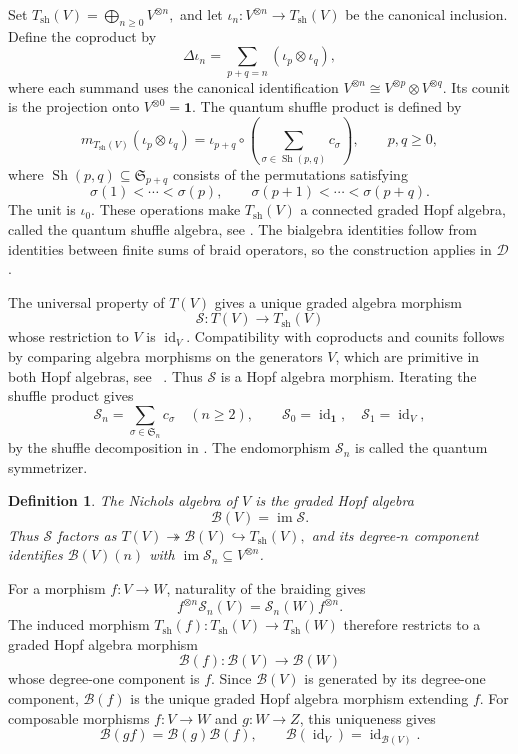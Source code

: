 \documentclass[11pt, a4paper]{article}
\numberwithin{equation}{section}
\newcommand{\D}{\mathcal D}
\newcommand{\B}{\mathcal B}
\newcommand{\one}{\mathbf 1}
\DeclareMathOperator{\id}{id}
\DeclareMathOperator{\im}{im}
\newtheorem{definition}[theorem]{Definition}
\begin{document}
Set
$
 T_{\mathrm{sh}}(V)=\bigoplus_{n\geq0}V^{\otimes n},
$
and let $\iota_n:V^{\otimes n}\to T_{\mathrm{sh}}(V)$ be the
canonical inclusion. Define the coproduct by
\[
 \Delta\iota_n
 =\sum_{p+q=n}(\iota_p\otimes\iota_q),
\]
where each summand uses the canonical identification
$V^{\otimes n}\cong V^{\otimes p}\otimes V^{\otimes q}$. Its counit is the projection
onto $V^{\otimes0}=\one$.
The quantum shuffle product is defined by
\[
 m_{T_{\mathrm{sh}}(V)}(\iota_p\otimes\iota_q)
 =\iota_{p+q}\circ
   \left(\sum_{\sigma\in\operatorname{Sh}(p,q)}c_\sigma\right),
 \qquad p,q\geq0,
\]
where $\operatorname{Sh}(p,q)\subseteq\mathfrak S_{p+q}$
consists of the permutations satisfying
\[
 \sigma(1)<\cdots<\sigma(p),
 \qquad
 \sigma(p+1)<\cdots<\sigma(p+q).
\]
The unit is $\iota_0$. These operations make $T_{\mathrm{sh}}(V)$
a connected graded Hopf algebra, called the quantum shuffle algebra,
see \cite[Section~6.5, p.~265]{rootsys}.
The bialgebra identities follow from identities between finite sums
of braid operators, so the construction applies in $\D$.

The universal property of $T(V)$ gives a unique graded algebra morphism
\[
 \mathcal S:T(V)\longrightarrow T_{\mathrm{sh}}(V)
\]
whose restriction to $V$ is $\id_V$. Compatibility with coproducts
and counits follows by comparing algebra morphisms on the generators
$V$, which are primitive in both Hopf algebras, see \
\cite[Proposition~6.4.7]{rootsys}.
Thus $\mathcal S$ is a Hopf algebra morphism.
Iterating the shuffle product gives
\[
 \mathcal S_n=\sum_{\sigma\in\mathfrak S_n}c_\sigma
 \quad(n\geq2),\qquad
 \mathcal S_0=\id_{\one},\quad \mathcal S_1=\id_V,
\]
by the shuffle decomposition in \cite[Corollary~1.8.4]{rootsys}.
The endomorphism $\mathcal S_n$ is called the quantum symmetrizer.




\begin{definition}\label{pre:nichols-definition}
The Nichols algebra of $V$ is the graded Hopf algebra
\[
 \B(V)=\im\mathcal S.
\]
 {Thus $\mathcal S$ factors as}
$
 T(V)\twoheadrightarrow\B(V)\hookrightarrow T_{\mathrm{sh}}(V),
$
and its degree-$n$ component identifies
$\B(V)(n)$ with $\im\mathcal S_n\subseteq V^{\otimes n}$.
\end{definition}


For a morphism $f:V\to W$, naturality of the braiding gives
\[
 f^{\otimes n}\mathcal S_n(V)
 =\mathcal S_n(W)f^{\otimes n}.
\]
The induced morphism
$T_{\mathrm{sh}}(f):T_{\mathrm{sh}}(V)\to T_{\mathrm{sh}}(W)$
therefore restricts to a graded Hopf algebra morphism
\[
 \B(f):\B(V)\longrightarrow\B(W)
\]
whose degree-one component is $f$.
Since $\B(V)$ is generated by its degree-one component,
$\B(f)$ is the unique graded Hopf algebra morphism extending $f$.
For composable morphisms $f:V\to W$ and $g:W\to Z$,
this uniqueness gives
\[
 \B(gf)=\B(g)\B(f),
 \qquad
 \B(\id_V)=\id_{\B(V)}.
\]
\end{document}
